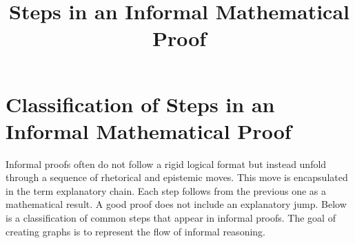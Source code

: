 \documentclass[12pt]{article}
\title{Steps in an Informal Mathematical Proof}
\begin{document}
\maketitle

\section*{Classification of Steps in an Informal Mathematical Proof}

Informal proofs often do not follow a rigid logical format but instead unfold through a sequence of rhetorical and epistemic moves. This move is encapsulated in the term explanatory chain. Each step follows from the previous one as a mathematical result. A good proof does not include an explanatory jump. Below is a classification of common steps that appear in informal proofs. The goal of creating graphs is to represent the flow of informal reasoning. 
\end{document}

